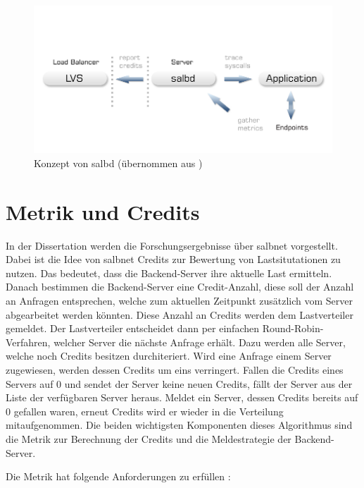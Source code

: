 \documentclass[a4paper, 12pt, BCOR10mm, DIV12, toc=bibliography, toc=listof, german]{scrbook}
\begin{document}

		\begin{figure}
			\centering
			\includegraphics[width=\textwidth]{images/salbd-concept.png}
			\caption{Konzept von salbd (übernommen aus \cite{zinke2012})}
			\label{fig:salbd}
		\end{figure}

		\section{Metrik und Credits} %
		\label{sub:metrik}

			In der Dissertation \cite{zinke2012} werden die Forschungsergebnisse über salbnet vorgestellt.
			Dabei ist die Idee von salbnet Credits zur Bewertung von Lastsitutationen zu nutzen. Das bedeutet,
			dass die Backend-Server ihre aktuelle Last ermitteln. Danach bestimmen die Backend-Server eine
			Credit-Anzahl, diese soll der Anzahl an Anfragen entsprechen, welche zum aktuellen Zeitpunkt
			zusätzlich vom Server abgearbeitet werden könnten. Diese Anzahl an Credits werden dem
			Lastverteiler gemeldet. Der Lastverteiler entscheidet dann per einfachen Round-Robin-Verfahren,
			welcher Server die nächste Anfrage erhält.  Dazu werden alle Server, welche noch Credits besitzen
			durchiteriert. Wird eine Anfrage einem Server zugewiesen, werden dessen Credits um eins
			verringert. Fallen die Credits eines Servers auf 0 und sendet der Server keine neuen Credits,
			fällt der Server aus der Liste der verfügbaren Server heraus. Meldet ein Server, dessen Credits
			bereits auf 0 gefallen waren, erneut Credits wird er wieder in die Verteilung mitaufgenommen. Die
			beiden wichtigsten Komponenten dieses Algorithmus sind die Metrik zur Berechnung der Credits und
			die Meldestrategie der Backend-Server.

			Die Metrik hat folgende Anforderungen zu erfüllen \cite{scsczile2008}:
\end{document}
